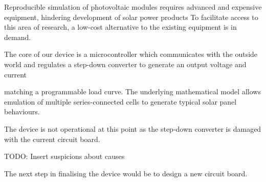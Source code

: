 

Reproducible simulation of photovoltaic modules requires
advanced and expensive equipment, hindering development of solar power products  
To facilitate access to this area of research, a low-cost alternative
to the existing equipment is in demand.

The core of our device is a microcontroller which communicates with the outside world and
regulates a step-down converter to generate an output voltage and current

matching a programmable load curve. The underlying mathematical
 model allows emulation of multiple
series-connected  cells to generate typical solar  panel  behaviours.

The  device is not operational  at this point as  the step-down
converter is damaged with the current circuit board.

TODO: Insert suspicions about causes

The next step in finalising the device would be to design a new circuit board.
